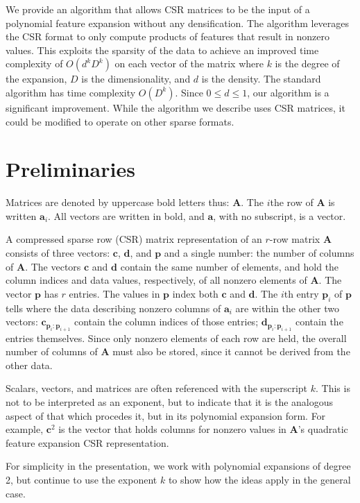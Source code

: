 \documentclass{article}
\begin{document}
We provide an algorithm that allows CSR matrices to be the input of a polynomial feature expansion without any densification.
The algorithm leverages the CSR format to only compute products of features that result in nonzero values.
This exploits the sparsity of the data to achieve an improved time complexity of $O(d^kD^k)$ on each vector of the matrix where $k$ is the degree of the expansion, $D$ is the dimensionality, and $d$ is the density.
The standard algorithm has time complexity $O(D^k)$.
Since $0 \le d \le 1$, our algorithm is a significant improvement.
While the algorithm we describe uses CSR matrices, it could be modified to operate on other sparse formats.

\section{Preliminaries}
Matrices are denoted by uppercase bold letters thus: $\bm{A}$. 
The $i$the row of $\bm{A}$ is written $\bm{a}_i$. All vectors are written in bold, and  $\bm{a}$, with no subscript, is a vector.

A compressed sparse row (CSR) matrix representation of an $r$-row matrix $\bm{A}$ consists of three vectors: $\bm{c}$, $\bm{d}$, and $\bm{p}$ and a single number: the number of columns of $\bm{A}$. The vectors
$\bm{c}$ and $\bm{d}$ contain the same number of elements, and hold the column indices and data values, respectively, of all nonzero elements of $\bm{A}$.
The vector $\bm{p}$ has $r$ entries. The values in $\bm{p}$ index both $\bm{c}$ and $\bm{d}$. The $i$th entry $\bm{p}_i$ of $\bm{p}$ tells where
the data describing nonzero columns of $\bm{a}_i$ are within the other two vectors: $\bm{c}_{\bm{p}_i:\bm{p}_{i+1}}$ contain the column indices of those entries; $\bm{d}_{\bm{p}_i:\bm{p}_{i+1}}$ contain the entries themselves.
Since only nonzero elements of each row are held, the overall number of columns of $\bm{A}$  must also be stored, since it cannot be derived
from the other data.

Scalars, vectors, and matrices are often referenced with the superscript $k$.
This is not to be interpreted as an exponent, but to indicate that it is the analogous aspect of that which procedes it, but in its polynomial expansion form.
For example, $\bm{c}^2$ is the vector that holds columns for nonzero values in $\bm{A}$'s quadratic feature expansion CSR representation.

For simplicity in the presentation, we work with polynomial expansions of degree 2, but continue to use the exponent $k$ to show how the ideas apply in the general case.
\end{document}
